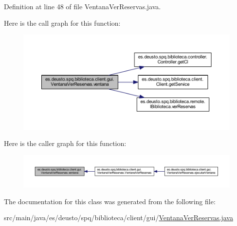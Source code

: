 Definition at line 48 of file Ventana\+Ver\+Reservas.\+java.

Here is the call graph for this function\+:
\nopagebreak
\begin{figure}[H]
\begin{center}
\leavevmode
\includegraphics[width=350pt]{classes_1_1deusto_1_1spq_1_1biblioteca_1_1client_1_1gui_1_1_ventana_ver_reservas_acb37e5558041a4fa7de51af1417a059f_cgraph}
\end{center}
\end{figure}
Here is the caller graph for this function\+:
\nopagebreak
\begin{figure}[H]
\begin{center}
\leavevmode
\includegraphics[width=350pt]{classes_1_1deusto_1_1spq_1_1biblioteca_1_1client_1_1gui_1_1_ventana_ver_reservas_acb37e5558041a4fa7de51af1417a059f_icgraph}
\end{center}
\end{figure}


The documentation for this class was generated from the following file\+:\begin{DoxyCompactItemize}
\item 
src/main/java/es/deusto/spq/biblioteca/client/gui/\mbox{\hyperlink{_ventana_ver_reservas_8java}{Ventana\+Ver\+Reservas.\+java}}\end{DoxyCompactItemize}
